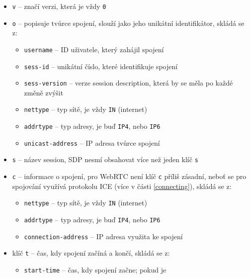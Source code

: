 \begin{itemize}
	\item \texttt{v} -- značí verzi, která je vždy \texttt{0}
	\item \texttt{o} -- popisuje tvůrce spojení, slouží jako jeho
	      unikátní identifikátor, skládá se z:
	      \begin{itemize}
		      \item \texttt{username} -- ID uživatele, který zahájil spojení
		      \item \texttt{sess-id} -- unikátní číslo, které
		            identifikuje spojení
		      \item \texttt{sess-version} -- verze session
		            description, která by se měla po každé změně zvýšit
		      \item \texttt{nettype} -- typ sítě, je vždy
		            \texttt{IN} (internet)
		      \item \texttt{addrtype} -- typ adresy, je buď
		            \texttt{IP4}, nebo \texttt{IP6}
		      \item \texttt{unicast-address} -- IP adresa tvůrce spojení
	      \end{itemize}
	\item \texttt{s} -- název session, SDP nesmí obsahovat více než
	      jeden klíč \texttt{s}
	\item \texttt{c} -- informace o spojení, pro WebRTC není klíč
	      \texttt{c} příliš zásadní, neboť se pro spojování využívá
	      protokolu ICE (více v části \ref{connecting}), skládá se z:
	      \begin{itemize}
		      \item \texttt{nettype} -- typ sítě, je vždy
		            \texttt{IN} (internet)
		      \item \texttt{addrtype} -- typ adresy, je buď
		            \texttt{IP4}, nebo \texttt{IP6}
		      \item \texttt{connection-address} -- IP adresa využita
		            ke spojení
	      \end{itemize}
	\item klíč \texttt{t} -- čas, kdy spojení začíná a končí, skládá
	      se z:
	      \begin{itemize}
		      \item \texttt{start-time} -- čas, kdy spojení začne; pokud je

\end{itemize}
\end{itemize}
